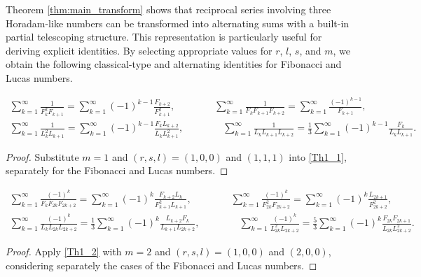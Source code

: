 \documentclass[12pt,reqno]{article}
\begin{document}
Theorem \ref{thm:main_transform} shows that reciprocal series involving three Horadam-like numbers can be transformed into alternating sums with a built-in partial telescoping structure. This representation is particularly useful for deriving explicit identities. By selecting appropriate values for $r$, $l$, $s$, and $m$, we obtain the following classical-type and alternating identities for Fibonacci and Lucas numbers.
\begin{corollary}
		\begin{gather*}
		\sum_{k=1}^\infty \frac{1}{F_{k}^2 F_{k+1}} = \sum_{k=1}^\infty (-1)^{k-1} \frac{F_{k+2}}{F_{k+1}^2}, \qquad\qquad
		\sum_{k=1}^\infty \frac{1}{F_{k} F_{k+1} F_{k+2}} = \sum_{k=1}^\infty \frac{(-1)^{k-1}}{F_{k+1}}, \\
		\sum_{k=1}^\infty \frac{1}{L_{k}^2 L_{k+1}} = \sum_{k=1}^\infty (-1)^{k-1} \frac{F_{k}L_{k+2}}{L_k L_{k+1}^2}, \qquad\qquad
		\sum_{k=1}^\infty \frac{1}{L_{k} L_{k+1} L_{k+2}} = \frac{1}{3} \sum_{k=1}^\infty (-1)^{k-1} \frac{F_k}{L_k L_{k+1}}.
		\end{gather*}
\end{corollary}
\begin{proof}
	Substitute $m=1$ and $(r,s,l)=(1,0,0)$ and $(1,1,1)$ into \eqref{Th1_1}, separately for the Fibonacci and Lucas numbers.
\end{proof}
\begin{corollary}
		\begin{gather*}
		\sum_{k=1}^\infty \frac{(-1)^k}{F_{k}F_{2k} F_{2k+2}} = \sum_{k=1}^\infty (-1)^{k} \frac{F_{k+2}L_{k}}{F^2_{k+1}L_{k+1}}, \qquad\qquad
		\sum_{k=1}^\infty \frac{(-1)^k}{F^2_{2k} F_{2k+2}} = \sum_{k=1}^\infty (-1)^{k} \frac{L_{2k+1}}{F^2_{2k+2}}, \\
		\sum_{k=1}^\infty \frac{(-1)^k}{L_{k}L_{2k} L_{2k+2}} = \frac{1}{3} \sum_{k=1}^\infty (-1)^{k} \frac{L_{k+2}F_{k}}{L_{k+1}L_{2k+2}}, \qquad\qquad
		\sum_{k=1}^\infty \frac{(-1)^k}{L^2_{2k} L_{2k+2}} = \frac{5}{3} \sum_{k=1}^\infty (-1)^{k} \frac{F_{2k} F_{2k+1}}{L_{2k} L^2_{2k+2}}.
		\end{gather*}
\end{corollary}
\begin{proof}
	Apply \eqref{Th1_2} with $m=2$ and $(r,s,l)=(1,0,0)$ and $(2,0,0)$, considering separately the cases of the Fibonacci and Lucas numbers.
\end{proof}
\end{document}
